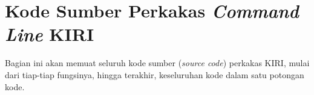 \chapter{Kode Sumber Perkakas \textit{Command Line} KIRI}
\label{lamp:A}

%
%
%

Bagian ini akan memuat seluruh kode sumber (\textit{source code}) perkakas \cl\xspace KIRI, mulai dari tiap-tiap fungsinya, hingga terakhir, keseluruhan kode dalam satu potongan kode.

